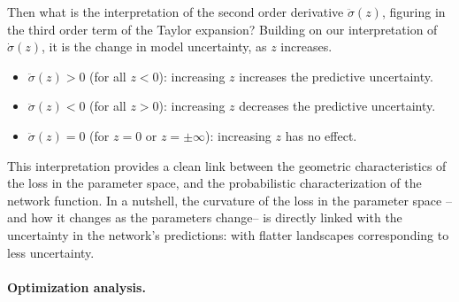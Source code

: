\documentclass{article} %
\begin{document}
Then what is the interpretation of the second order derivative $\ddot \sigma(z)$, figuring in the third order term of the Taylor expansion? Building on our interpretation of $\dot \sigma(z)$, it is the change in model uncertainty, as $z$ increases. 
\begin{itemize}
    \item $\ddot\sigma(z) > 0$ (for all $z<0$): increasing $z$ increases the predictive uncertainty. 
    \item $\ddot\sigma(z) <0$ (for all $z>0$): increasing $z$ decreases the predictive uncertainty. 
    \item $\ddot\sigma(z) = 0$ (for $z=0$ or $z=\pm \infty$): increasing $z$ has no effect.
\end{itemize}

This interpretation provides a clean link between the geometric characteristics of the loss in the parameter space, and the probabilistic characterization of the network function. In a nutshell, the curvature of the loss in the parameter space --and how it changes as the parameters change-- is directly linked with the uncertainty in the network's predictions: with flatter landscapes corresponding to less uncertainty.

\paragraph{Optimization analysis.}
\end{document}

